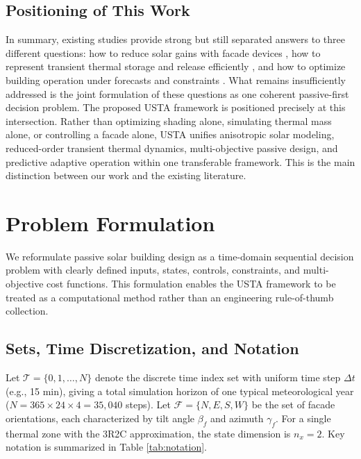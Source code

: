 \documentclass[preprint,12pt]{elsarticle}
\begin{document}
\subsection{Positioning of This Work}

In summary, existing studies provide strong but still separated answers to three different questions: how to reduce solar gains with facade devices \cite{kirimtat2016,perez1990,valladares2014,nazari2023}, how to represent transient thermal storage and release efficiently \cite{verbeke2018,yang2024,lauster2014}, and how to optimize building operation under forecasts and constraints \cite{drgona2020,zhan2021,goncalves2024}. What remains insufficiently addressed is the joint formulation of these questions as one coherent passive-first decision problem. The proposed USTA framework is positioned precisely at this intersection. Rather than optimizing shading alone, simulating thermal mass alone, or controlling a facade alone, USTA unifies anisotropic solar modeling, reduced-order transient thermal dynamics, multi-objective passive design, and predictive adaptive operation within one transferable framework. This is the main distinction between our work and the existing literature.

\section{Problem Formulation}
\label{sec:formulation}

We reformulate passive solar building design as a time-domain sequential decision problem with clearly defined inputs, states, controls, constraints, and multi-objective cost functions. This formulation enables the USTA framework to be treated as a computational method rather than an engineering rule-of-thumb collection.

\subsection{Sets, Time Discretization, and Notation}

Let $\mathcal{T} = \{0, 1, \ldots, N\}$ denote the discrete time index set with uniform time step $\Delta t$ (e.g., 15 min), giving a total simulation horizon of one typical meteorological year ($N = 365 \times 24 \times 4 = 35,040$ steps). Let $\mathcal{F} = \{N, E, S, W\}$ be the set of facade orientations, each characterized by tilt angle $\beta_f$ and azimuth $\gamma_f$. For a single thermal zone with the 3R2C approximation, the state dimension is $n_x = 2$. Key notation is summarized in Table \ref{tab:notation}.
\end{document}
